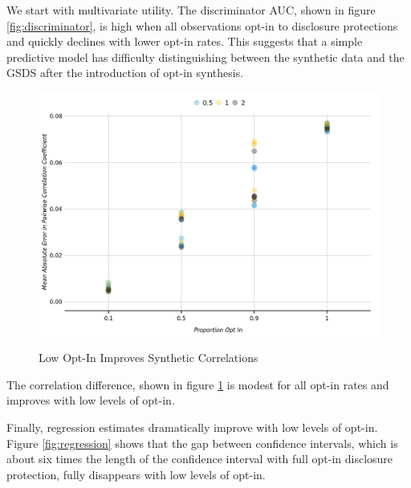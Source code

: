 \documentclass[
]{urban-formatting}
\begin{document}
We start with multivariate utility. The discriminator AUC, shown in
figure \ref{fig:discriminator}, is high when all observations opt-in to
disclosure protections and quickly declines with lower opt-in rates.
This suggests that a simple predictive model has difficulty
distinguishing between the synthetic data and the GSDS after the
introduction of opt-in synthesis.

\begin{figure}[!htb]
    \caption{Low Opt-In Improves Synthetic Correlations}
    \centering
    \includegraphics[width=6.5in]{../analysis/figures/correlation-difference-1.png}
    \label{fig:correlation-difference}
\end{figure}

The correlation difference, shown in figure
\ref{fig:correlation-difference} is modest for all opt-in rates and
improves with low levels of opt-in.

Finally, regression estimates dramatically improve with low levels of
opt-in. Figure \ref{fig:regression} shows that the gap between
confidence intervals, which is about six times the length of the
confidence interval with full opt-in disclosure protection, fully
disappears with low levels of opt-in.
\end{document}
